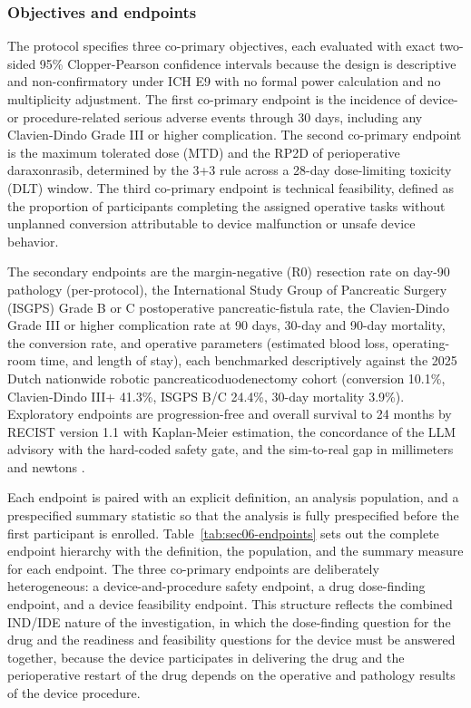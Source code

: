 \subsubsection*{Objectives and endpoints}

The protocol specifies three co-primary objectives, each evaluated with exact
two-sided 95\% Clopper-Pearson confidence intervals because the design is
descriptive and non-confirmatory under ICH E9 with no formal power calculation and
no multiplicity adjustment. The first co-primary endpoint is the incidence of
device- or procedure-related serious adverse events through 30 days, including any
Clavien-Dindo Grade III or higher complication. The second co-primary endpoint is
the maximum tolerated dose (MTD) and the RP2D of perioperative daraxonrasib,
determined by the 3+3 rule across a 28-day dose-limiting toxicity (DLT) window. The
third co-primary endpoint is technical feasibility, defined as the proportion of
participants completing the assigned operative tasks without unplanned conversion
attributable to device malfunction or unsafe device behavior. 

The secondary
endpoints are the margin-negative (R0) resection rate on day-90 pathology
(per-protocol), the International Study Group of Pancreatic Surgery (ISGPS) Grade B
or C postoperative pancreatic-fistula rate, the Clavien-Dindo Grade III or higher
complication rate at 90 days, 30-day and 90-day mortality, the conversion rate, and
operative parameters (estimated blood loss, operating-room time, and length of
stay), each benchmarked descriptively against the 2025 Dutch nationwide robotic
pancreaticoduodenectomy cohort (conversion 10.1\%, Clavien-Dindo III+ 41.3\%, ISGPS
B/C 24.4\%, 30-day mortality 3.9\%). Exploratory endpoints are progression-free and
overall survival to 24 months by RECIST version 1.1 with Kaplan-Meier estimation,
the concordance of the LLM advisory with the hard-coded safety gate, and the
sim-to-real gap in millimeters and newtons \cite{daraxwhipple,oncotrialllm}.

Each endpoint is paired with an explicit definition, an analysis population, and a
prespecified summary statistic so that the analysis is fully prespecified before the
first participant is enrolled. Table~\ref{tab:sec06-endpoints} sets out the complete
endpoint hierarchy with the definition, the population, and the summary measure for
each endpoint. The three co-primary endpoints are deliberately heterogeneous: a
device-and-procedure safety endpoint, a drug dose-finding endpoint, and a device
feasibility endpoint. This structure reflects the combined IND/IDE nature of the
investigation, in which the dose-finding question for the drug and the readiness and
feasibility questions for the device must be answered together, because the device
participates in delivering the drug and the perioperative restart of the drug depends
on the operative and pathology results of the device procedure.

